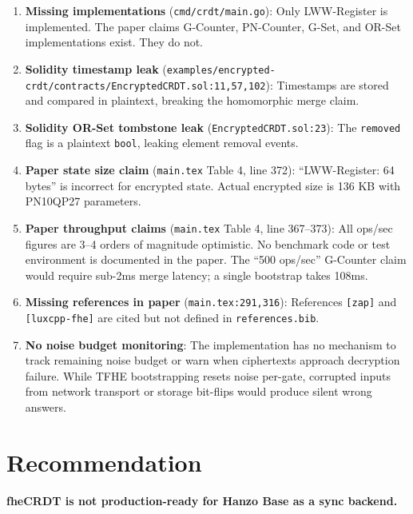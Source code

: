 \documentclass{fhe-shared/luxfhe}
\begin{document}
\begin{enumerate}
\item \textbf{Missing implementations} (\texttt{cmd/crdt/main.go}):
      Only LWW-Register is implemented.  The paper claims G-Counter,
      PN-Counter, G-Set, and OR-Set implementations exist.  They do not.

\item \textbf{Solidity timestamp leak}
      (\texttt{examples/encrypted-crdt/contracts/EncryptedCRDT.sol:11,57,102}):
      Timestamps are stored and compared in plaintext, breaking the
      homomorphic merge claim.

\item \textbf{Solidity OR-Set tombstone leak}
      (\texttt{EncryptedCRDT.sol:23}):
      The \texttt{removed} flag is a plaintext \texttt{bool}, leaking
      element removal events.

\item \textbf{Paper state size claim} (\texttt{main.tex} Table 4, line 372):
      ``LWW-Register: 64 bytes'' is incorrect for encrypted state.
      Actual encrypted size is 136 KB with PN10QP27 parameters.

\item \textbf{Paper throughput claims} (\texttt{main.tex} Table 4, line 367--373):
      All ops/sec figures are 3--4 orders of magnitude optimistic.
      No benchmark code or test environment is documented in the paper.
      The ``500 ops/sec'' G-Counter claim would require sub-2ms merge
      latency; a single bootstrap takes 108ms.

\item \textbf{Missing references in paper} (\texttt{main.tex:291,316}):
      References \texttt{[zap]} and \texttt{[luxcpp-fhe]} are cited but
      not defined in \texttt{references.bib}.

\item \textbf{No noise budget monitoring}: The implementation has no
      mechanism to track remaining noise budget or warn when ciphertexts
      approach decryption failure.  While TFHE bootstrapping resets noise
      per-gate, corrupted inputs from network transport or storage bit-flips
      would produce silent wrong answers.
\end{enumerate}

\section{Recommendation}

\textbf{fheCRDT is not production-ready for Hanzo Base as a sync backend.}
\end{document}
